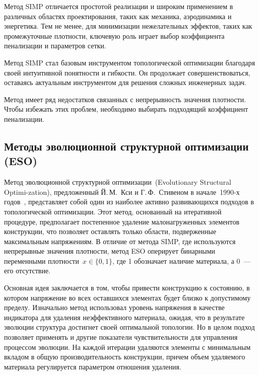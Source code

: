 Метод SIMP отличается простотой реализации и широким применением в различных областях проектирования, таких как механика, аэродинамика и энергетика. Тем не менее, для минимизации нежелательных эффектов, таких как промежуточные плотности, ключевую роль играет выбор коэффициента пенализации и параметров сетки.

Метод SIMP стал базовым инструментом топологической оптимизации благодаря своей интуитивной понятности и гибкости. Он продолжает совершенствоваться, оставаясь актуальным инструментом для решения сложных инженерных задач.

Метод имеет ряд недостатков связанных с непрерывность значения плотности. Чтобы избежать этих проблем, необходимо выбирать подходящий коэффициент пенализации.




\subsection{Методы эволюционной структурной оптимизации (ESO)}

Метод эволюционной структурной оптимизации~(Evolutionary Structural Optimi-zation), предложенный Й.\,М.~Кси и Г.\,Ф.~Стивеном в начале~1990-х годов~\cite{x:1993}, представляет собой один из наиболее активно развивающихся подходов в топологической оптимизации. 
Этот метод, основанный на итеративной процедуре, предполагает постепенное удаление малонагруженных элементов конструкции, что позволяет оставлять только области, подверженные максимальным напряжениям. 
В отличие от метода SIMP, где используются непрерывные значения плотности, метод ESO оперирует бинарными переменными плотности~$x\in\{0,1\}$, где 1 обозначает наличие материала, а 0~--- его отсутствие.

Основная идея заключается в том, чтобы привести конструкцию к состоянию, в котором напряжение во всех оставшихся элементах будет близко к допустимому пределу.           
Изначально метод использовал уровень напряжения в качестве индикатора для удаления неэффективного материала, ожидая, что в результате эволюции структура достигнет своей оптимальной топологии. 
Но в целом подход позволяет применять и другие показатели чувствительности для управления процессом эволюции. На каждой итерации удаляются элементы с минимальным вкладом в общую производительность конструкции, причем объем удаляемого материала регулируется параметром отношения удаления.


